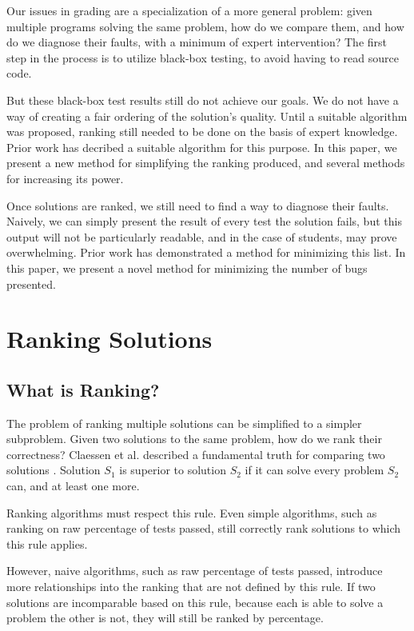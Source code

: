 \documentclass[11pt,twoside]{article}
\theoremstyle{definition}
\let\cite=\citep
\begin{document}
Our issues in grading are a specialization of a more general problem: given multiple programs solving the same problem, how do we compare them, and how do we diagnose their faults, with a minimum of expert intervention? The first step in the process is to utilize black-box testing, to avoid having to read source code.

But these black-box test results still do not achieve our goals. We do not have a way of creating a fair ordering of the solution's quality. Until a suitable algorithm was proposed, ranking still needed to be done on the basis of expert knowledge. Prior work has decribed a suitable algorithm for this purpose. In this paper, we present a new method for simplifying the ranking produced, and several methods for increasing its power.

Once solutions are ranked, we still need to find a way to diagnose their faults. Naively, we can simply present the result of every test the solution fails, but this output will not be particularly readable, and in the case of students, may prove overwhelming. Prior work has demonstrated a method for minimizing this list. In this paper, we present a novel method for minimizing the number of bugs presented.

\section{Ranking Solutions}
\subsection{What is Ranking?}

The problem of ranking multiple solutions can be simplified to a simpler subproblem. Given two solutions to the same problem, how do we rank their correctness? Claessen et al. described a fundamental truth for comparing two solutions \cite{Claessen}. Solution $S_1$ is superior to solution $S_2$ if it can solve every problem $S_2$ can, and at least one more.

Ranking algorithms must respect this rule. Even simple algorithms, such as ranking on raw percentage of tests passed, still correctly rank solutions to which this rule applies. 

However, naive algorithms, such as raw percentage of tests passed, introduce more relationships into the ranking that are not defined by this rule. If two solutions are incomparable based on this rule, because each is able to solve a problem the other is not, they will still be ranked by percentage.
\end{document}
